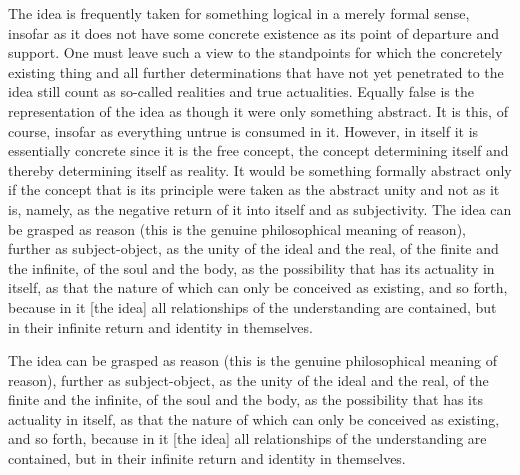     The idea is frequently taken for something logical in a merely
    formal sense, insofar as it does not have some concrete existence
    as its point of departure and support.
    One must leave such a view to the standpoints for which
    the concretely existing thing and all further determinations
    that have not yet penetrated to the idea still count as
    so-called realities and true actualities.
    Equally false is the representation of the idea
    as though it were only something abstract.
    It is this, of course, insofar as everything untrue is consumed in it.
    However, in itself it is essentially concrete since it is the free concept,
    the concept determining itself and thereby determining itself as reality.
    It would be something formally abstract only if the concept
    that is its principle were taken as the abstract unity and not as it is,
    namely, as the negative return of it into itself and as subjectivity.
    The idea can be grasped as reason
    (this is the genuine philosophical meaning of reason),
    further as subject-object, as the unity of the ideal and the real,
    of the finite and the infinite, of the soul and the body,
    as the possibility that has its actuality in itself,
    as that the nature of which can only be conceived as existing,
    and so forth, because in it [the idea] all relationships of
    the understanding are contained,
    but in their infinite return and identity in themselves.

The idea can be grasped as reason
(this is the genuine philosophical meaning of reason),
further as subject-object, as the unity of the ideal and the real,
of the finite and the infinite, of the soul and the body,
as the possibility that has its actuality in itself,
as that the nature of which can only be conceived as existing,
and so forth, because in it [the idea] all relationships of
the understanding are contained,
but in their infinite return and identity in themselves.

